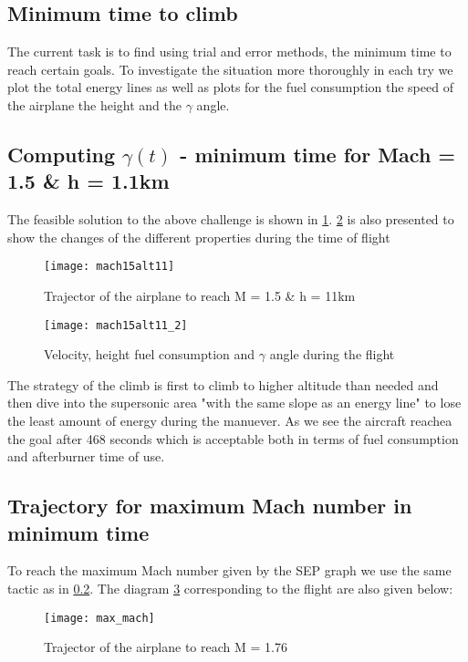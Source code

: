 \subsection{Minimum time to climb}

\noindent The current task is to find using trial and error methods, the minimum time 
to reach certain goals. To investigate the situation more thoroughly 
in each try we plot the total energy lines as well as plots for the fuel consumption
the speed of the airplane the height and the $\gamma$ angle.

\subsection{Computing $\gamma(t)$  - minimum time for Mach = 1.5 \& h = 1.1km}
\label{sec:m15h11}

The feasible solution to the above challenge is shown in \ref{fig:m15h11}. \ref{fig:m15h11_2}
is also presented to show the changes of the different properties during the time of flight

\begin{figure}[H]
    \centering
    \texttt{[image: mach15alt11]}
    \caption{Trajector of the airplane to reach M = 1.5 \& h = 11km}
    \label{fig:m15h11}
\end{figure}

\begin{figure}[H]
    \centering
    \texttt{[image: mach15alt11\_2]}
    \caption{Velocity, height fuel consumption and $\gamma$ angle during the flight}
    \label{fig:m15h11_2}
\end{figure}

The strategy of the climb is first to climb to higher altitude than needed and then
dive into the supersonic area "with the same slope as an energy line" to
lose the least amount of energy during the manuever.
As we see  the aircraft reachea the goal after 468 seconds which is acceptable both in terms of 
fuel consumption and afterburner time of use.


\subsection{Trajectory for maximum Mach number in minimum time}
To reach the maximum Mach number given by the SEP graph we use the same
tactic as in \ref{sec:m15h11}. The diagram \ref{fig:max_mach} corresponding to the flight are also given below:

\begin{figure}[H]
    \centering
    \texttt{[image: max\_mach]}
    \caption{Trajector of the airplane to reach M = 1.76}
    \label{fig:max_mach}
\end{figure}

